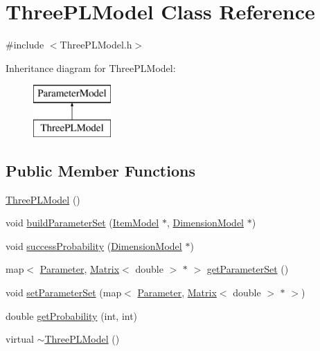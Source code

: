\hypertarget{classThreePLModel}{}\section{Three\+P\+L\+Model Class Reference}
\label{classThreePLModel}


{\ttfamily \#include $<$Three\+P\+L\+Model.\+h$>$}

Inheritance diagram for Three\+P\+L\+Model\+:\begin{figure}[H]
\begin{center}
\leavevmode
\includegraphics[height=2.000000cm]{classThreePLModel}
\end{center}
\end{figure}
\subsection*{Public Member Functions}
\begin{DoxyCompactItemize}
\item 
\hyperlink{classThreePLModel_a97470c701290327dc55b87a10874156c}{Three\+P\+L\+Model} ()
\item 
void \hyperlink{classThreePLModel_a7242d2bf961e6bf167cc7ca89cf36a67}{build\+Parameter\+Set} (\hyperlink{classItemModel}{Item\+Model} $\ast$, \hyperlink{classDimensionModel}{Dimension\+Model} $\ast$)
\item 
void \hyperlink{classThreePLModel_a983cdd653542d76b150c502ac88a3a0d}{success\+Probability} (\hyperlink{classDimensionModel}{Dimension\+Model} $\ast$)
\item 
map$<$ \hyperlink{ParameterModel_8h_a04ed5b8f1f3adf7af1d5092fae847e90}{Parameter}, \hyperlink{singletonMatrix}{Matrix}$<$ double $>$ $\ast$ $>$ \hyperlink{classThreePLModel_ae87fb19a09c536da3fb9cbbfc443bc8e}{get\+Parameter\+Set} ()
\item 
void \hyperlink{classThreePLModel_aa049135b26ea1a9f81f23dfac6195696}{set\+Parameter\+Set} (map$<$ \hyperlink{ParameterModel_8h_a04ed5b8f1f3adf7af1d5092fae847e90}{Parameter}, \hyperlink{singletonMatrix}{Matrix}$<$ double $>$ $\ast$ $>$)
\item 
double \hyperlink{classThreePLModel_a36cdc7dc2e7b009a54c773de3645707b}{get\+Probability} (int, int)
\item 
virtual \hyperlink{classThreePLModel_a146e9c48084c708708060cf433346f1b}{$\sim$\+Three\+P\+L\+Model} ()
\end{DoxyCompactItemize}
